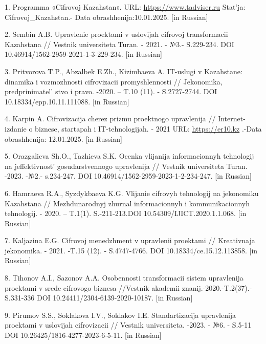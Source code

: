 \begin{references}
1. Programma «Cifrovoj Kazahstan». URL: \href{https://www.tadviser.ru/index.php/}{https://www.tadviser.ru} Stat'ja:
Cifrovoj\_Kazahstan.- Data obrashhenija:10.01.2025. {[}in Russian{]}

2. Sembin A.B. Upravlenie proektami v uslovijah cifrovoj transformacii
Kazahstana // Vestnik universiteta Turan. - 2021. - №3.- S.229-234. DOI
10.46914/1562-2959-2021-1-3-229-234. {[}in Russian{]}

3. Pritvorova T.P., Abzalbek E.Zh., Kizimbaeva A. IT-uslugi v Kazahstane:
dinamika i vozmozhnosti cifrovizacii promyshlennosti // Jekonomika,
predprinimatel' stvo i pravo. -2020. -- T.10 (11). -
S.2727-2744. DOI 10.18334/epp.10.11.111088. {[}in Russian{]}

4. Karpin A. Cifrovizacija cherez prizmu proektnogo upravlenija //
Internet-izdanie o biznese, startapah i IT-tehnologijah. - 2021 URL:
\href{https://er10.kz/read/analitika/cifrovizaciya-cherez-prizmu-proektnogo-upravleniya/}{https://er10.kz} .-Data
obrashhenija: 12.01.2025. {[}in Russian{]}

5. Orazgalieva Sh.O., Tazhieva S.K. Ocenka vlijanija informacionnyh
tehnologij na jeffektivnost'{} gosudar\-stvennogo
upravlenija // Vestnik universiteta Turan. -2023. -№2.- s.234-247. DOI
10.46914/1562-2959-2023-1-2-234-247. {[}in Russian{]}

6. Hamraeva R.A., Syzdykbaeva K.G. Vlijanie cifrovyh tehnologij na
jekonomiku Kazahstana // Mezhdu\-narodnyj zhurnal informacionnyh i
kommunikacionnyh tehnologij. - 2020. -- T.1(1). S.-211-213.DOI
10.54309/IJICT.2020.1.1.068. {[}in Russian{]}

7. Kaljazina E.G. Cifrovoj menedzhment v upravlenii proektami //
Kreativnaja jekonomika. - 2021. -T.15 (12). - S.4747-4766. DOI
10.18334/ce.15.12.113858. {[}in Russian{]}

8. Tihonov A.I., Sazonov A.A. Osobennosti transformacii sistem
upravlenija proektami v srede cifrovogo biznesa //Vestnik akademii
znanij.-2020.-T.2(37).- S.331-336 DOI 10.24411/2304-6139-2020-10187.
{[}in Russian{]}

9. Pirumov S.S., Soklakova I.V., Soklakov I.E. Standartizacija
upravlenija proektami v uslovijah cifroviz\-acii // Vestnik universiteta.
-2023. - №6. - S.5-11 DOI 10.26425/1816-4277-2023-6-5-11. {[}in
Russian{]}
\end{references}

